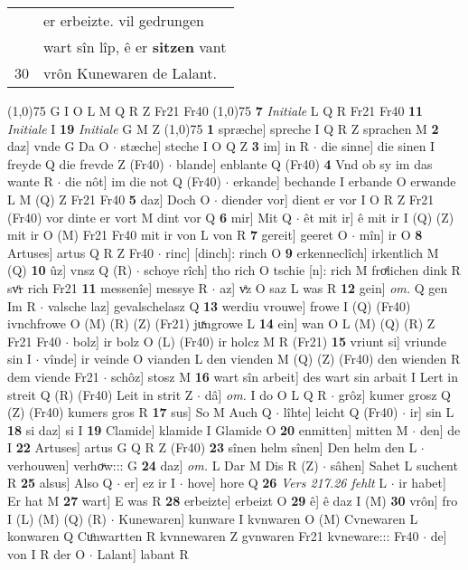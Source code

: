 \documentclass[8pt,a4paper,notitlepage]{article}
\begin{document}
\begin{table}[ht]
\begin{minipage}[t]{0.5\linewidth}
\begin{tabular}{rl}
 & er erbeizte. vil gedrungen\\ 
 & wart sîn lîp, ê er \textbf{sitzen} vant\\ 
30 & vrôn Kunewaren de Lalant.\\ 
\end{tabular}
\scriptsize
\line(1,0){75} \newline
G I O L M Q R Z Fr21 Fr40 \newline
\line(1,0){75} \newline
\textbf{7} \textit{Initiale} L Q R Fr21 Fr40  \textbf{11} \textit{Initiale} I  \textbf{19} \textit{Initiale} G M Z  \newline
\line(1,0){75} \newline
\textbf{1} spræche] spreche I Q R Z sprachen M \textbf{2} daz] vnde G Da O  $\cdot$ stæche] steche I O Q Z \textbf{3} im] in R  $\cdot$ die sinne] die sinen I freyde Q die frevde Z (Fr40)  $\cdot$ blande] enblante Q (Fr40) \textbf{4} Vnd ob sy im das wante R  $\cdot$ die nôt] im die not Q (Fr40)  $\cdot$ erkande] bechande I erbande O erwande L M (Q) Z Fr21 Fr40 \textbf{5} daz] Doch O  $\cdot$ diender vor] dient er vor I O R Z Fr21 (Fr40) vor dinte er vort M dint vor Q \textbf{6} mir] Mit Q  $\cdot$ êt mit ir] ê mit ir I (Q) (Z) mit ir O (M) Fr21 Fr40 mit ir von L von R \textbf{7} gereit] geeret O  $\cdot$ mîn] ir O \textbf{8} Artuses] artus Q R Z Fr40  $\cdot$ rinc] [dinch]: rinch O \textbf{9} erkenneclîch] irkentlich M (Q) \textbf{10} ûz] vnsz Q (R)  $\cdot$ schoye rîch] tho rich O tschie [n]: rich M froͯlichen dink R svͦr rich Fr21 \textbf{11} messenîe] messye R  $\cdot$ az] vͣz O saz L was R \textbf{12} gein] \textit{om.} Q gen Im R  $\cdot$ valsche laz] gevalschelasz Q \textbf{13} werdiu vrouwe] frowe I (Q) (Fr40) ivnchfrowe O (M) (R) (Z) (Fr21) juͯngrowe L \textbf{14} ein] wan O L (M) (Q) (R) Z Fr21 Fr40  $\cdot$ bolz] ir bolz O (L) (Fr40) ir holcz M R (Fr21) \textbf{15} vriunt si] vriunde sin I  $\cdot$ vînde] ir veinde O vianden L den vienden M (Q) (Z) (Fr40) den wienden R dem viende Fr21  $\cdot$ schôz] stosz M \textbf{16} wart sîn arbeit] des wart sin arbait I Lert in streit Q (R) (Fr40) Leit in strit Z  $\cdot$ dâ] \textit{om.} I do O L Q R  $\cdot$ grôz] kumer grosz Q (Z) (Fr40) kumers gros R \textbf{17} sus] So M Auch Q  $\cdot$ lîhte] leicht Q (Fr40)  $\cdot$ ir] sin L \textbf{18} si daz] si I \textbf{19} Clamide] klamide I Glamide O \textbf{20} enmitten] mitten M  $\cdot$ den] de I \textbf{22} Artuses] artus G Q R Z (Fr40) \textbf{23} sînen helm sînen] Den helm den L  $\cdot$ verhouwen] verhoͮw::: G \textbf{24} daz] \textit{om.} L Dar M Dis R (Z)  $\cdot$ sâhen] Sahet L suchent R \textbf{25} alsus] Also Q  $\cdot$ er] ez ir I  $\cdot$ hove] hore Q \textbf{26} \textit{Vers 217.26 fehlt} L   $\cdot$ ir habet] Er hat M \textbf{27} wart] E was R \textbf{28} erbeizte] erbeizt O \textbf{29} ê] ê daz I (M) \textbf{30} vrôn] fro I (L) (M) (Q) (R)  $\cdot$ Kunewaren] kunware I kvnwaren O (M) Cvnewaren L konwaren Q Cuͦnwartten R kvnnewaren Z gvnwaren Fr21 kvneware::: Fr40  $\cdot$ de] von I R der O  $\cdot$ Lalant] labant R \newline

\end{minipage}
\end{table}
\end{document}
